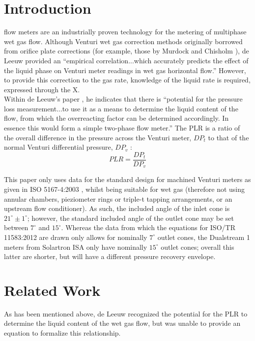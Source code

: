 \documentclass[journal]{IEEEtran}
\begin{document}
\section{Introduction}
 flow meters are an industrially proven technology for the metering of multiphase wet gas flow. Although Venturi wet gas correction methods originally borrowed from orifice plate corrections (for example, those by Murdock \cite{Murdock1962} and Chisholm \cite{Chisholm1977}), de Leeuw \cite{DeLeeuw1997} provided an ``empirical correlation...which accurately predicts the effect of the liquid phase on Venturi meter readings in wet gas horizontal flow.''  However, to provide this correction to the gas rate, knowledge of the liquid rate is required, expressed through the \acrfull{X}.\\

Within de Leeuw's paper \cite{DeLeeuw1997}, he indicates that there is ``potential for the pressure loss measurement...to use it as a means to determine the liquid content of the flow, from which the overreacting factor can be determined accordingly. In essence this would form a simple two-phase flow meter.''  The \acrlong{PLR} is a ratio of the overall difference in the pressure across the Venturi meter, $DP_{t}$ to that of the normal Venturi differential pressure, $DP_{v}$ :
\begin{equation}
    PLR = \frac{DP_{t}}{DP_{v}}
\end{equation}


This paper only uses data for the standard design for machined Venturi meters as given in ISO 5167-4:2003 \cite{2003ISOTubes}, whilst being suitable for wet gas (therefore not using annular chambers, pieziometer rings or triple-t tapping arrangements, or an upstream flow conditioner).  As such, the included angle of the inlet cone is $21^{\circ} \pm 1^{\circ}$; however, the standard included angle of the outlet cone may be set between $7^{\circ}$ and $15^{\circ}$.  Whereas the data from which the equations for ISO/TR 11583:2012 are drawn only allows for nominally $7^{\circ}$ outlet cones, the Dualstream 1 meters from Solartron ISA only have nominally $15^{\circ}$ outlet cones; overall this latter are shorter, but will have a different pressure recovery envelope.

\section{Related Work}
As has been mentioned above, de Leeuw \cite{DeLeeuw1997} recognized the potential for the \acrshort{PLR} to determine the liquid content of the wet gas flow, but was unable to provide an equation to formalize this relationship.  
\end{document}
